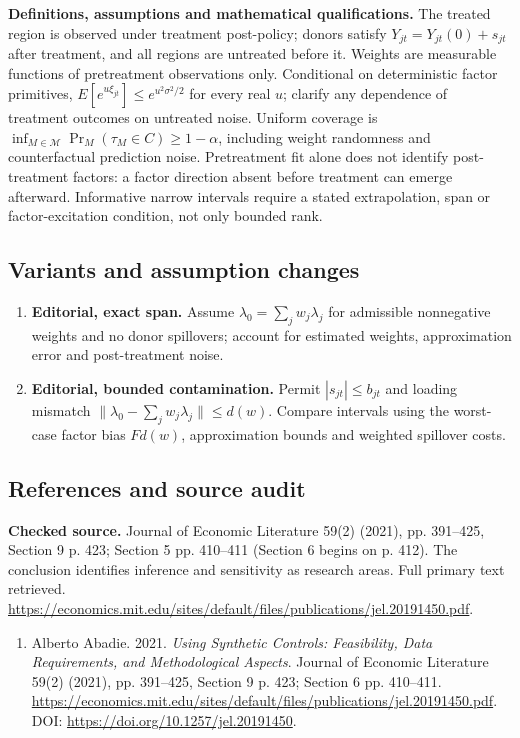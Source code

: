 \documentclass[11pt,a4paper]{article}
\begin{document}
\textbf{Definitions, assumptions and mathematical qualifications.} The treated region is observed under treatment post-policy; donors satisfy \(Y_{jt}=Y_{jt}(0)+s_{jt}\) after treatment, and all regions are untreated before it. Weights are measurable functions of pretreatment observations only. Conditional on deterministic factor primitives, \(E[e^{u\xi_{jt}}]\leq e^{u^2\sigma^2/2}\) for every real \(u\); clarify any dependence of treatment outcomes on untreated noise. Uniform coverage is \(\inf_{M\in\mathcal M}\Pr_M(\tau_M\in C)\geq1-\alpha\), including weight randomness and counterfactual prediction noise. Pretreatment fit alone does not identify post-treatment factors: a factor direction absent before treatment can emerge afterward. Informative narrow intervals require a stated extrapolation, span or factor-excitation condition, not only bounded rank.
\subsection*{Variants and assumption changes}
\begin{enumerate}
\item \textbf{Editorial, exact span.} Assume \(\lambda_0=\sum_jw_j\lambda_j\) for admissible nonnegative weights and no donor spillovers; account for estimated weights, approximation error and post-treatment noise.
\item \textbf{Editorial, bounded contamination.} Permit \(|s_{jt}|\leq b_{jt}\) and loading mismatch \(\|\lambda_0-\sum_jw_j\lambda_j\|\leq d(w)\). Compare intervals using the worst-case factor bias \(F d(w)\), approximation bounds and weighted spillover costs.
\end{enumerate}
\subsection*{References and source audit}
\textbf{Checked source.} Journal of Economic Literature 59(2) (2021), pp. 391--425, Section 9 p. 423; Section 5 pp. 410--411 (Section 6 begins on p. 412). The conclusion identifies inference and sensitivity as research areas. Full primary text retrieved. \url{https://economics.mit.edu/sites/default/files/publications/jel.20191450.pdf}.
\begin{enumerate}\raggedright
\item\hypertarget{definitions:source:30007707:1}{} Alberto Abadie. 2021. \emph{Using Synthetic Controls: Feasibility, Data Requirements, and Methodological Aspects}. Journal of Economic Literature 59(2) (2021), pp. 391--425, Section 9 p. 423; Section 6 pp. 410--411.
\url{https://economics.mit.edu/sites/default/files/publications/jel.20191450.pdf}.
DOI: \url{https://doi.org/10.1257/jel.20191450}.
\end{enumerate}
\end{document}
